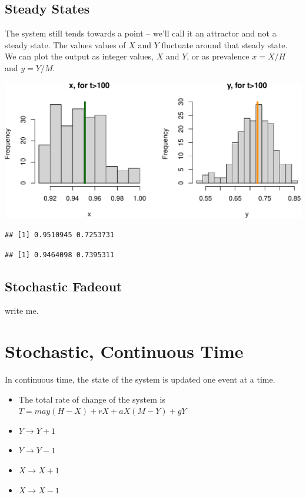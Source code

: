 \documentclass[
]{book}
\begin{document}
\subsection{Steady States}\label{steady-states-2}

The system still tends towards a point -- we'll call it an attractor and not a steady state. The values
values of \(X\) and \(Y\) fluctuate around that steady state. We can plot the output as integer values, \(X\) and \(Y\), or as prevalence \(x=X/H\) and \(y=Y/M.\)

\includegraphics{docs/figs/unnamed-chunk-50-1.pdf}

\begin{verbatim}
## [1] 0.9510945 0.7253731
\end{verbatim}

\begin{verbatim}
## [1] 0.9464098 0.7395311
\end{verbatim}

\subsection{Stochastic Fadeout}\label{stochastic-fadeout}

write me.

\section{Stochastic, Continuous Time}\label{sxdeRoss}

In continuous time, the state of the system is updated one event at a time.

\begin{itemize}
\item
  The total rate of change of the system is \(T = may(H-X) + rX + aX(M-Y) + gY\)
\item
  \(Y \rightarrow Y+1\)
\item
  \(Y \rightarrow Y-1\)
\item
  \(X \rightarrow X+1\)
\item
  \(X \rightarrow X-1\)
\end{itemize}
\end{document}
